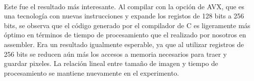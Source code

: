 \documentclass[a4paper]{article}
\begin{document}
\noindent%
\begin{minipage}{\linewidth}%
\end{minipage}
\ \

Este fue el resultado más interesante. Al compilar con la opción de AVX, que es una tecnología con nuevas instrucciones y expande los registos de 128 bits a 256 bits, se observa que el código generado por el compilador de C es ligeramente más óptimo en términos de tiempo de procesamiento que el realizado por nosotros en assembler. Era un resultado igualmente esperable, ya que al utilizar registros de 256 bits se reducen aún más los accesos a memoria necesarios para traer y guardar pixeles. La relación lineal entre tamaño de imagen y tiempo de procesamiento se mantiene nuevamente en el experimento.
\end{document}
